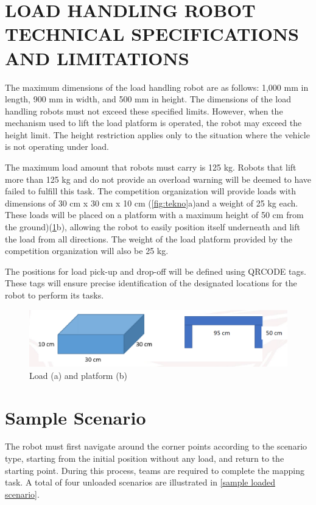 \documentclass[../../main]{subfiles}
\begin{document}
\section[Load Handling Robot Specs \& Limits]{LOAD HANDLING ROBOT TECHNICAL SPECIFICATIONS AND LIMITATIONS}

The maximum dimensions of the load handling robot are as follows: 1,000 mm in length, 900 mm in width, and 500 mm in height. The dimensions of the load handling robots must not exceed these specified limits. However, when the mechanism used to lift the load platform is operated, the robot may exceed the height limit. The height restriction applies only to the situation where the vehicle is not operating under load.

The maximum load amount that robots must carry is 125 kg. Robots that lift more than 125 kg and do not provide an overload warning will be deemed to have failed to fulfill this task. The competition organization will provide loads with dimensions of 30 cm x 30 cm x 10 cm (\cref{fig:tekno}a)and a weight of 25 kg each. These loads will be placed on a platform with a maximum height of 50 cm from the ground)(\cref{fig:tekno3}b), allowing the robot to easily position itself underneath and lift the load from all directions. The weight of the load platform provided by the competition organization will also be 25 kg.

The positions for load pick-up and drop-off will be defined using QRCODE tags. These tags will ensure precise identification of the designated locations for the robot to perform its tasks.
\begin{figure}[h!]
    \centering
    \includegraphics[width=\textwidth]{img/load.png}
    \caption{Load (a) and platform (b)}
    \label{fig:tekno3}
\end{figure}

\section{Sample Scenario}

The robot must first navigate around the corner points according to the scenario type, starting from the initial position without any load, and return to the starting point. During this process, teams are required to complete the mapping task. A total of four unloaded scenarios are illustrated in \cref{sample loaded scenario}.
\end{document}
